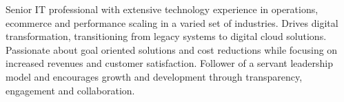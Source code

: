 Senior IT professional with extensive technology experience in operations, ecommerce and performance scaling in a varied set of industries. Drives digital transformation, transitioning from legacy systems to digital cloud solutions. Passionate about goal oriented solutions and cost reductions while focusing on increased revenues and customer satisfaction. Follower of a servant leadership model and encourages growth and development through transparency, engagement and collaboration.  


